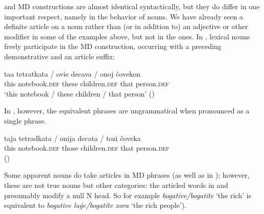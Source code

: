 \documentclass[output=paper]{langscibook}
\begin{document}
\noindent {} and  MD constructions are almost identical syntactically, but they do differ in one important respect, namely in the behavior of nouns. We have already seen a definite article on a noun rather than (or in addition to) an adjective or other modifier in some of the  examples above, but not in the  ones. In , lexical nouns freely participate in the MD construction, occurring with a preceding demonstrative and an article suffix:


\ea
\gll taa tetratkata / ovie decava / onoj čovekon \\
this notebook.\textsc{def} { } these children.\textsc{def} { } that person.\textsc{def} \\
\glt `this notebook / these children / that person' \hfill()
\z

\begin{sloppypar}
\noindent In , however, the equivalent phrases are ungrammatical when pronounced as a single phrase.
\end{sloppypar}


\ea
\gll \minsp{*} taja tetradkata / \minsp{*} onija decata / \minsp{*} tozi čoveka \\
{} this notebook.\textsc{def} { } {} those children.\textsc{def} { } {} that person.\textsc{def} \\  \hfill()
\z

\noindent Some apparent nouns do take articles in  MD phrases (as well as in ); however, these are not true nouns but other categories: the articled words in   and  presumably  modify a null N head. So for example \textit{bogative\slash bogatite} `the rich' is equivalent to \textit{bogative luǵe/bogatite xora} ‘the rich people’).
\end{document}
